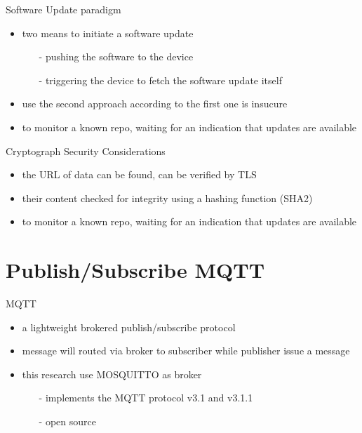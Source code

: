 \documentclass{beamer}
\begin{document}
\begin{frame}{Software Update paradigm}
    \begin{itemize}
        \item{two means to initiate a software update}
        \begin{itemize}
            \item[-] pushing the software to the device
            \item[-] triggering the device to fetch the software update itself
        \end{itemize}
        \item{use the second approach according to the first one is insucure}
        \item{to monitor a known repo, waiting for an indication that updates are available}
    \end{itemize}
\end{frame}

\begin{frame}{Cryptograph Security Considerations}
    \begin{itemize}
        \item{the URL of data can be found, can be verified by TLS}
        \item{their content checked for integrity using a hashing function (SHA2)}
        \item{to monitor a known repo, waiting for an indication that updates are available}
    \end{itemize}
\end{frame}
\section{Publish/Subscribe MQTT}

\begin{frame}{MQTT}
    \begin{itemize}
        \item{a lightweight brokered publish/subscribe protocol}
        \item{message will routed via broker to subscriber while publisher issue a message}
        \item{this research use MOSQUITTO as broker}
        \begin{itemize}
            \item[-] implements the MQTT protocol v3.1 and v3.1.1
            \item[-] open source
        \end{itemize}
    \end{itemize}
\end{frame}
\end{document}
